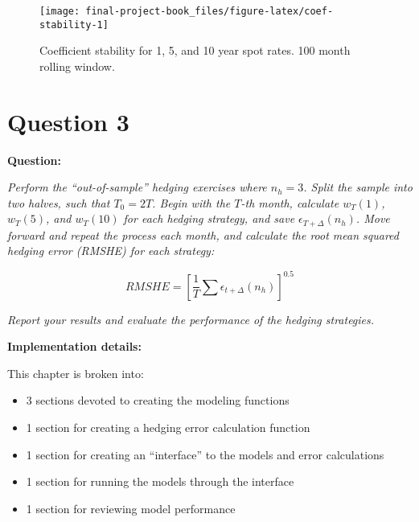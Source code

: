 \documentclass[openany]{book}
\providecommand{\tightlist}{%
  \setlength{\itemsep}{0pt}\setlength{\parskip}{0pt}}
\theoremstyle{definition}
\theoremstyle{definition}
\theoremstyle{definition}
\theoremstyle{remark}
\begin{document}
\small

\begin{figure}[H]

{\centering \texttt{[image: final-project-book\_files/figure-latex/coef-stability-1]} 

}

\caption{Coefficient stability for 1, 5, and 10 year spot rates. 100 month rolling window.}\label{fig:coef-stability}
\end{figure}

\normalsize

\small

\normalsize

\hypertarget{q3}{%
\chapter{Question 3}\label{q3}}

\textbf{Question:}

\emph{Perform the ``out-of-sample'' hedging exercises where \(n_h = 3\).
Split the sample into two halves, such that \(T_0 = 2T\). Begin with the
\(T\)-th month, calculate \(w_T(1)\), \(w_T(5)\), and \(w_T(10)\) for
each hedging strategy, and save \(\epsilon_{T+\Delta}(n_h)\). Move
forward and repeat the process each month, and calculate the root mean
squared hedging error (RMSHE) for each strategy:}

\[ RMSHE = [\frac{1}{T} \sum{\epsilon_{t+\Delta}(n_h)}]^{0.5} \]

\emph{Report your results and evaluate the performance of the hedging
strategies.}

\textbf{Implementation details:}

This chapter is broken into:

\begin{itemize}
\tightlist
\item
  3 sections devoted to creating the modeling functions
\item
  1 section for creating a hedging error calculation function
\item
  1 section for creating an ``interface'' to the models and error
  calculations
\item
  1 section for running the models through the interface
\item
  1 section for reviewing model performance
\end{itemize}

\small

\normalsize
\end{document}
